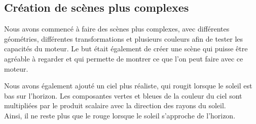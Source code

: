 
\subsection{Création de scènes plus complexes}
Nous avons commencé à faire des scènes plus complexes, avec différentes géométries, différentes transformations et plusieurs couleurs afin de tester les capacités du moteur. Le but était également de créer une scène qui puisse être agréable à regarder et qui permette de montrer ce que l'on peut faire avec ce moteur.\\ 
\par
Nous avons également ajouté un ciel plus réaliste, qui rougit lorsque le soleil est bas sur l'horizon. Les composantes vertes et bleues de la couleur du ciel sont multipliées par le produit scalaire avec la direction des rayons du soleil.\\
Ainsi, il ne reste plus que le rouge lorsque le soleil s'approche de l'horizon.
